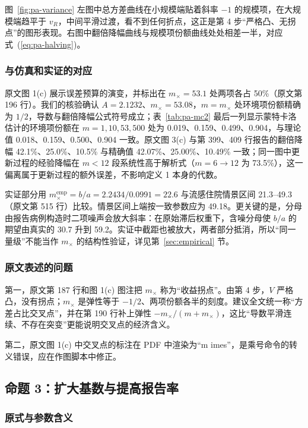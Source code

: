 图~\ref{fig:pa-variance} 左图中总方差曲线在小规模端贴着斜率 $-1$ 的规模项，在大规模端趋平于 $v_R$，中间平滑过渡，看不到任何折点，这正是第 4 步“严格凸、无拐点”的图形表现。右图中翻倍降幅曲线与规模项份额曲线处处相差一半，对应式~(\ref{eq:pa-halving})。

\subsubsection{与仿真和实证的对应}

原文图 1(c) 展示误差预算的演变，并标出在 $m_\times=53.1$ 处两项各占 50\%（原文第 196 行）。我们的核验确认 $A=2.1232$、$m_\times=53.08$，$m=m_\times$ 处环境项份额精确为 $1/2$，导数与翻倍降幅公式符号成立；表~\ref{tab:pa-mc2} 最后一列显示蒙特卡洛估计的环境项份额在 $m=1,10,53,500$ 处为 0.019、0.159、0.499、0.904，与理论值 0.018、0.159、0.500、0.904 一致。原文图 3(c) 与第 399、409 行报告的翻倍降幅 42.1\%、25.0\%、10.5\% 与精确值 42.07\%、25.00\%、10.49\% 一致；同一图中更新过程的经验降幅在 $m<12$ 段系统性高于解析式（$m=6\to12$ 为 73.5\%），这一偏离属于更新过程的额外误差，不影响定义 1 本身的代数。

实证部分用 $m_\times^{\mathrm{emp}}=b/a=2.2434/0.0991=22.6$ 与流感住院情景区间 21.3--49.3（原文第 515 行）比较。情景区间上端按一致参数应为 49.18。更关键的是，分母由报告病例构造时二项噪声会放大斜率：在原始滞后权重下，含噪分母使 $b/a$ 的期望由真实的 30.7 升到 59.2。实证中截距也被放大，两者部分抵消，所以“同一量级”不能当作 $m_\times$ 的结构性验证，详见第~\ref{sec:empirical} 节。

\subsubsection{原文表述的问题}

第一，原文第 187 行和图 1(c) 图注把 $m_\times$ 称为“收益拐点”。由第 4 步，$V$ 严格凸，没有拐点；$m_\times$ 是弹性等于 $-1/2$、两项份额各半的刻度。建议全文统一称“方差占比交叉点”，并在第 190 行补上弹性 $-m_\times/(m+m_\times)$，这比“导数平滑连续、不存在突变”更能说明交叉点的经济含义。

第二，原文图 1(c) 中交叉点的标注在 PDF 中渲染为“m imes”，是乘号命令的转义错误，应在作图脚本中修正。

\subsection{命题 3：扩大基数与提高报告率}

\subsubsection{原式与参数含义}

